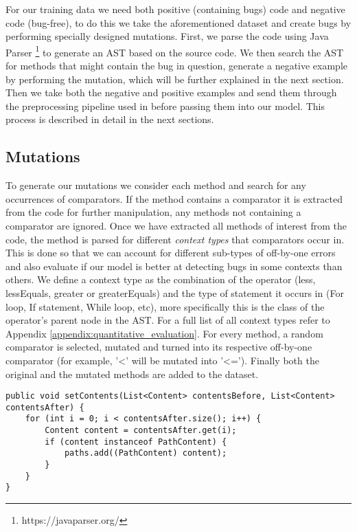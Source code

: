 For our training data we need both positive (containing bugs) code and negative code (bug-free), to do this we take the aforementioned dataset and create bugs by performing specially designed mutations. First, we parse the code using Java Parser \footnote{https://javaparser.org/} to generate an AST based on the source code. We then search the AST for methods that might contain the bug in question, generate a negative example by performing the mutation, which will be further explained in the next section. Then we take both the negative and positive examples and send them through the preprocessing pipeline used in \cite{alon2019code2vec} before passing them into our model. This process is described in detail in the next sections.



\subsection{Mutations}\label{sec:mutations}

To generate our mutations we consider each method and search for any occurrences of comparators. If the method contains a comparator it is extracted from the code for further manipulation, any methods not containing a comparator are ignored. Once we have extracted all methods of interest from the code, the method is parsed for different \textit{context types} that comparators occur in. This is done so that we can account for different sub-types of off-by-one errors and also evaluate if our model is better at detecting bugs in some contexts than others. We define a context type as the combination of the operator (less, lessEquals, greater or greaterEquals) and the type of statement it occurs in (For loop, If statement, While loop, etc), more specifically this is the class of the operator's parent node in the AST. For a full list of all context types refer to Appendix \ref{appendix:quantitative_evaluation}. For every method, a random comparator is selected, mutated and turned into its respective off-by-one comparator (for example, '<' will be mutated into '<='). Finally both the original and the mutated methods are added to the dataset.

\begin{lstlisting}[caption={An example of a method before mutation. The context type of this comparator is FORless},captionpos=b]
public void setContents(List<Content> contentsBefore, List<Content> contentsAfter) {
    for (int i = 0; i < contentsAfter.size(); i++) {
        Content content = contentsAfter.get(i);
        if (content instanceof PathContent) {
            paths.add((PathContent) content);
        }
    }
}
\end{lstlisting}


